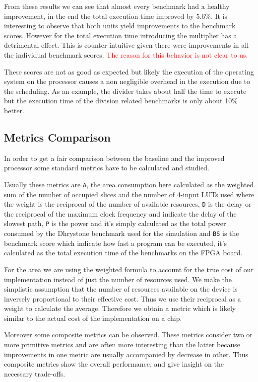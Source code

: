 From these results we can see that almost every benchmark had a healthy improvement, in the end
the total execution time improved by 5.6\%.
It is interesting to observe that both units yield improvements to the benchmark scores.
However for the total execution time introducing the multiplier has a detrimental effect.
This is counter-intuitive given there were improvements in all the individual benchmark scores.
\textcolor{red}{\large The reason for this behavior is not clear to us.}

These scores are not as good as expected but likely the execution of the operating system
on the processor causes a non negligible overhead in the execution due to the scheduling. As an example, the
divider takes about half the time to execute but the execution time of the division related
benchmarks is only about 10\% better.

\subsection{Metrics Comparison}
\label{ssec:metrics}

In order to get a fair comparison between the baseline and the improved processor some standard
metrics have to be calculated and studied.

Usually these metrics are \texttt{A}, the area consumption here calculated as the weighted sum of the
number of occupied slices and the number of 4-input LUTs used where the weight is the reciprocal
of the number of available resources, \texttt{D} is the delay or the reciprocal of the maximum clock frequency
and indicate the delay of the slowest path, \texttt{P} is the power and it's simply calculated as the total
power consumed by the Dhrystone benchmark used for the simulation and \texttt{BS} is the benchmark
score which indicate how fast a program can be executed, it's calculated as the total execution
time of the benchmarks on the FPGA board.

For the area we are using the weighted formula to account for the true cost of our implementation instead of just the number of resources used.
We make the simplistic assumption that the number of resources available on the device is inversely proportional to their effective cost. Thus we use their reciprocal as a weight to calculate the average. Therefore we obtain a metric which is likely similar to the actual cost of the implementation on a chip.

Moreover some composite metrics can be observed. These metrics consider two or more primitive
metrics and are often more interesting than the latter because improvements in one metric are usually accompanied by decrease in other.
Thus composite metrics show the overall performance, and give insight on the necessary trade-offs.

